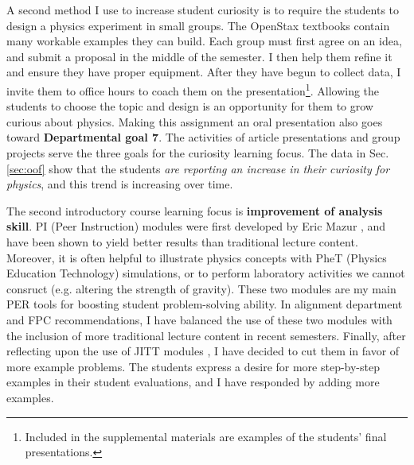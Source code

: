 \documentclass[../../../main.tex]{subfiles}
\begin{document}
A second method I use to increase student curiosity is to require the students to design a physics experiment in small groups.  The OpenStax textbooks contain many workable examples they can build.  Each group must first agree on an idea, and submit a proposal in the middle of the semester.  I then help them refine it and ensure they have proper equipment.  After they have begun to collect data, I invite them to office hours to coach them on the presentation\footnote{Included in the supplemental materials are examples of the students' final presentations.}.  Allowing the students to choose the topic and design is an opportunity for them to grow curious about physics.  Making this assignment an oral presentation also goes toward \textbf{Departmental goal 7}.  The activities of article presentations and group projects serve the three goals for the curiosity learning focus.  The data in Sec. \ref{sec:oof} show that the students \textit{are reporting an increase in their curiosity for physics}, and this trend is increasing over time. \\ \hspace{0.1cm}

The second introductory course learning focus is \textbf{improvement of analysis skill}.  PI (Peer Instruction) modules were first developed by Eric Mazur \cite{mazur2013peer}, and have been shown to yield better results than traditional lecture content.  Moreover, it is often helpful to illustrate physics concepts with PheT (Physics Education Technology) simulations, or to perform laboratory activities we cannot consruct (e.g. altering the strength of gravity)\cite{phet}.  These two modules are my main PER tools for boosting student problem-solving ability.  In alignment department and FPC recommendations, I have balanced the use of these two modules with the inclusion of more traditional lecture content in recent semesters.  Finally, after reflecting upon the use of JITT modules \cite{jitt}, I have decided to cut them in favor of more example problems.  The students express a desire for more step-by-step examples in their student evaluations, and I have responded by adding more examples. \\ \hspace{0.1cm}
\end{document}
